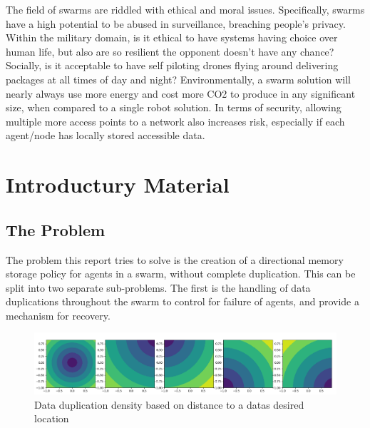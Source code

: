 \documentclass{UoYCSproject}
\begin{document}
\begin{summary}

The field of swarms are riddled with ethical and moral issues. Specifically, swarms have a high potential to be abused in surveillance, breaching people's privacy. Within the military domain, is it ethical to have systems having choice over human life, but also are so resilient the opponent doesn’t have any chance? Socially, is it acceptable to have self piloting drones flying around delivering packages at all times of day and night? Environmentally, a swarm solution will nearly always use more energy and cost more CO2 to produce in any significant size, when compared to a single robot solution. In terms of security, allowing multiple more access points to a network also increases risk, especially if each agent/node has locally stored accessible data.

\end{summary}




\chapter{Introductury Material}
\label{cha:Introductury Material}

\section{The Problem}
\label{sec:Problem}

The problem this report tries to solve is the creation of a directional memory storage policy for agents in a swarm, without complete duplication.
This can be split into two separate sub-problems.
The first is the handling of data duplications throughout the swarm to control for failure of agents, and provide a mechanism for recovery.

\begin{figure}[htb]
\label{fig:popdensity}
\begin{center}
\centering
\includegraphics[width=\linewidth]{"./ExplanationImgs/Memory_Pop_Density.png"}
\caption{Data duplication density based on distance to a datas desired location}
\end{center}
\end{figure}
\end{document}
